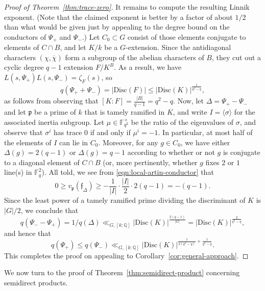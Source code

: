 \documentclass[12pt]{amsart}
\theoremstyle{definition} \newtheorem{definition}[theorem]{Definition}
\theoremstyle{example} \newtheorem{example}[theorem]{Example}
\theoremstyle{remark} \newtheorem{remark}{Remark}[theorem]
\numberwithin{equation}{section}
\numberwithin{theorem}{section}
\renewcommand{\leq}{\leqslant}
\renewcommand{\geq}{\geqslant}
\begin{document}
\begin{proof}[Proof of Theorem~\ref{thm:trace-zero}]
		It remains to compute the resulting Linnik exponent.  (Note that the claimed exponent is better by a factor of about $1/2$ than what would be given just by appealing to the degree bound on the conductors of $\Psi_+$ and $\Psi_-$.)  Let $C_0 \subset G$ consist of those elements conjugate to elements of $C \cap B$, and let $K/k$ be a $G$-extension.  Since the antidiagonal characters $(\chi,\overline{\chi})$ form a subgroup of the abelian characters of $B$, they cut out a cyclic degree $q-1$ extension $F/K^B$.  As a result, we have $L(s,\Psi_+)L(s,\Psi_-) = \zeta_F(s)$, so 
			\[
				q(\Psi_+ + \Psi_-)
					= |\mathrm{Disc}(F)|
					\leq |\mathrm{Disc}(K)|^{\frac{1}{q^2-q}},
			\]
		as follows from observing that $[K:F] = \frac{|B|}{q-1} = q^2-q$.  Now, let $\Delta = \Psi_+ - \Psi_-$ and let $\mathfrak{p}$ be a prime of $k$ that is tamely ramified in $K$, and write $I = \langle \sigma \rangle$ for the associated inertia subgroup.  Let $\mu \in \mathbb{F}_{q^2}^\times$ be the ratio of the eigenvalues of $\sigma$, and observe that $\sigma^i$ has trace $0$ if and only if $\mu^i = -1$.  In particular, at most half of the elements of $I$ can lie in $C_0$.  Moreover, for any $g \in C_0$, we have either $\Delta(g) =  2(q-1)$ or $\Delta(g) = q-1$ according to whether or not $g$ is conjugate to a diagonal element of $C \cap B$ (or, more pertinently, whether $g$ fixes $2$ or $1$ line(s) in $\mathbb{F}_q^2$).  All told, we see from \eqref{eqn:local-artin-conductor} that
			\[
				0 
					\geq v_\mathfrak{p}(\mathfrak{f}_\Delta)
					\geq - \frac{1}{|I|} \cdot \frac{|I|}{2} \cdot 2(q-1)
					= -(q-1).					
			\]
		Since the least power of a tamely ramified prime dividing the discriminant of $K$ is $|G|/2$, we conclude that
			\[
				q(\Psi_- - \Psi_+)
					=1/q(\Delta)
					\ll_{G,[k:\mathbb{Q}]} |\mathrm{Disc}(K)|^{\frac{2(q-1)}{|G|}}
					= |\mathrm{Disc}(K)|^{\frac{2}{q^3-q}},
			\]
		and hence that
			\[
				q(\Psi_+) 
					\leq q(\Psi_-)
					\ll_{G,[k:\mathbb{Q}]} |\mathrm{Disc}(K)|^{\frac{1}{2(q^2-q)} + \frac{1}{q^3-q}}.
			\]
		This completes the proof on appealing to Corollary~\ref{cor:general-approach}.
	\end{proof}
	
	We now turn to the proof of Theorem~\ref{thm:semidirect-product} concerning semidirect products.
	
\end{document}
